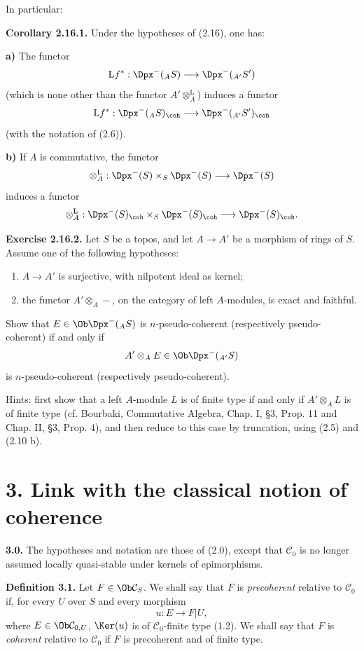 In particular:

\textbf{Corollary 2.16.1.} Under the hypotheses of (2.16), one has:

\textbf{a)} The functor
\[
  \mathrm L f^*: \Dpx^-(_A S)\longrightarrow \Dpx^-(_{A'}S')
\]
(which is none other than the functor \(A'\otimes_A^{\mathrm L}\)) induces a functor
\[
  \mathrm L f^*: \Dpx^-(_A S)_{\coh}\longrightarrow \Dpx^-(_{A'}S')_{\coh}
\]
(with the notation of (2.6)).

\textbf{b)} If \(A\) is commutative, the functor
\[
  \otimes_A^{\mathrm L}:\Dpx^-(S)\times_S\Dpx^-(S)
  \longrightarrow \Dpx^-(S)
\]
induces a functor
\[
  \otimes_A^{\mathrm L}:\Dpx^-(S)_{\coh}\times_S\Dpx^-(S)_{\coh}
  \longrightarrow \Dpx^-(S)_{\coh} .
\]

\textbf{Exercise 2.16.2.} Let \(S\) be a topos, and let \(A\to A'\) be a morphism of rings of \(S\). Assume one of the following hypotheses:
\begin{enumerate}[label=(\roman*)]
\item \(A\to A'\) is surjective, with nilpotent ideal as kernel;
\item the functor \(A'\otimes_A-\), on the category of left \(A\)-modules, is exact and faithful.
\end{enumerate}
Show that \(E\in\Ob\Dpx^-(_A S)\) is \(n\)-pseudo-coherent (respectively pseudo-coherent) if and only if
\[
  A'\otimes_A E\in\Ob\Dpx^-(_{A'}S)
\]
is \(n\)-pseudo-coherent (respectively pseudo-coherent).

Hints: first show that a left \(A\)-module \(L\) is of finite type if and only if \(A'\otimes_A L\) is of finite type (cf. Bourbaki, Commutative Algebra, Chap. I, §3, Prop. 11 and Chap. II, §3, Prop. 4), and then reduce to this case by truncation, using (2.5) and (2.10 b).

\section*{3. Link with the classical notion of coherence}

\textbf{3.0.} The hypotheses and notation are those of (2.0), except that \(\mathcal C_0\) is no longer assumed locally quasi-stable under kernels of epimorphisms.

\textbf{Definition 3.1.} Let \(F\in\Ob\mathcal C_S\). We shall say that \(F\) is \emph{precoherent} relative to \(\mathcal C_0\) if, for every \(U\) over \(S\) and every morphism
\[
  u:E\longrightarrow F|U,
\]
where \(E\in\Ob\mathcal C_{0,U}\), \(\Ker(u)\) is of \(\mathcal C_0\)-finite type (1.2). We shall say that \(F\) is \emph{coherent} relative to \(\mathcal C_0\) if \(F\) is precoherent and of finite type.

